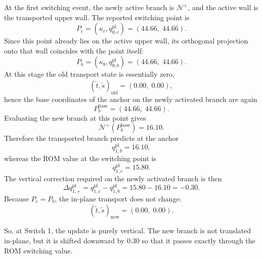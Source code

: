 \documentclass[11pt,a4paper]{article}
\begin{document}
At the first switching event, the newly active branch is \(\mathcal{N}^{+}\), and the active wall is the transported upper wall. The reported switching point is
\begin{equation}
P_c
=
(\kappa_c,q^{\mathrm{pl}}_{0,c})
=
(44.66,\;44.66).
\end{equation}
Since this point already lies on the active upper wall, its orthogonal projection onto that wall coincides with the point itself:
\begin{equation}
P_b
=
(\kappa_b,q^{\mathrm{pl}}_{0,b})
=
(44.66,\;44.66).
\end{equation}
At this stage the old transport state is essentially zero,
\begin{equation}
(\tilde t,\tilde s)_{\mathrm{old}}=(0.00,\;0.00),
\end{equation}
hence the base coordinates of the anchor on the newly activated branch are again
\begin{equation}
P_b^{\mathrm{base}}=(44.66,\;44.66).
\end{equation}
Evaluating the new branch at this point gives
\begin{equation}
\mathcal{N}^{+}(P_b^{\mathrm{base}})=16.10.
\end{equation}
Therefore the transported branch predicts at the anchor
\begin{equation}
q^{\mathrm{pl}}_{1,b}=16.10,
\end{equation}
whereas the ROM value at the switching point is
\begin{equation}
q^{\mathrm{pl}}_{1,c}=15.80.
\end{equation}
The vertical correction required on the newly activated branch is then
\begin{equation}
\Delta q^{\mathrm{pl}}_{1,+}
=
q^{\mathrm{pl}}_{1,c}-q^{\mathrm{pl}}_{1,b}
=
15.80-16.10
=
-0.30.
\end{equation}
Because \(P_c=P_b\), the in-plane transport does not change:
\begin{equation}
(\tilde t,\tilde s)_{\mathrm{new}}=(0.00,\;0.00).
\end{equation}

So, at Switch 1, the update is purely vertical. The new branch is not translated in-plane, but it is shifted downward by \(0.30\) so that it passes exactly through the ROM switching value.
\end{document}
